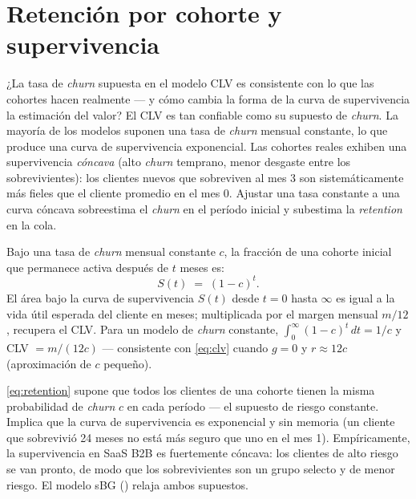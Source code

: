 \section{Retención por cohorte y supervivencia}\label{sec:retention}

¿La tasa de \emph{churn} supuesta en el modelo CLV es consistente con lo que las cohortes hacen realmente --- y cómo cambia la forma de la curva de supervivencia la estimación del valor? El CLV es tan confiable como su supuesto de \emph{churn}. La mayoría de los modelos suponen una tasa de \emph{churn} mensual constante, lo que produce una curva de supervivencia exponencial. Las cohortes reales exhiben una supervivencia \emph{cóncava} (alto \emph{churn} temprano, menor desgaste entre los sobrevivientes): los clientes nuevos que sobreviven al mes 3 son sistemáticamente más fieles que el cliente promedio en el mes 0. Ajustar una tasa constante a una curva cóncava sobreestima el \emph{churn} en el período inicial y subestima la \emph{retention} en la cola.

Bajo una tasa de \emph{churn} mensual constante \(c\), la fracción de una cohorte inicial que permanece activa después de \(t\) meses es:
\begin{equation}\label{eq:retention}
  S(t) \;=\; (1 - c)^{t} .
\end{equation}
El área bajo la curva de supervivencia \(S(t)\) desde \(t=0\) hasta \(\infty\) es igual a la vida útil esperada del cliente en meses; multiplicada por el margen mensual \(m/12\), recupera el CLV. Para un modelo de \emph{churn} constante, \(\int_0^\infty (1-c)^t\,dt = 1/c\) y CLV \(= m/(12c)\) --- consistente con \cref{eq:clv} cuando \(g=0\) y \(r\approx 12c\) (aproximación de \(c\) pequeño).

\cref{eq:retention} supone que todos los clientes de una cohorte tienen la misma probabilidad de \emph{churn} \(c\) en cada período --- el supuesto de riesgo constante. Implica que la curva de supervivencia es exponencial y sin memoria (un cliente que sobrevivió 24 meses no está más seguro que uno en el mes 1). Empíricamente, la supervivencia en SaaS B2B es fuertemente cóncava: los clientes de alto riesgo se van pronto, de modo que los sobrevivientes son un grupo selecto y de menor riesgo. El modelo sBG (\textcite{fader2005rfm}) relaja ambos supuestos.

